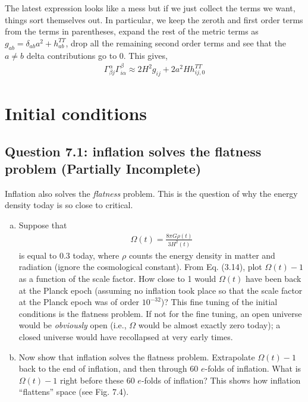 \documentclass[11pt]{article}
\begin{document}
\begin{enumerate}[(a)]
    The latest expression looks like a mess but if we just collect the terms we want, things sort themselves out. In particular, we keep the zeroth and first order terms from the terms in parentheses, expand the rest of the metric terms as $g_{ab} = \delta_{ab}a^2 + h_{ab}^{TT}$, drop all the remaining second order terms and see that the $a \neq b$ delta contributions go to 0. This gives,
    \begin{align*}
        \Gamma^\alpha_{\beta j}\Gamma^\beta_{i\alpha} \approx 2H^2 g_{ij} + 2a^2 H h_{ij,0}^{TT} 
    \end{align*}
\end{enumerate}

\newpage 
\section{Initial conditions}
\subsection{Question 7.1: inflation solves the flatness problem (Partially Incomplete)}
Inflation also solves the \textit{flatness} problem. This is the question of why the energy density today is so close to critical.
\begin{enumerate} [(a)]
    \item Suppose that 
    \begin{align*}
        \Omega(t) = \frac{8\pi G\rho(t)}{3H^2(t)}
    \end{align*}
    is equal to 0.3 today, where $\rho$ counts the energy density in matter and radiation (ignore the cosmological constant). From Eq. (3.14), plot $\Omega(t) -1$ as a function of the scale factor. How close to 1 would $\Omega(t)$ have been back at the Planck epoch (assuming no inflation took place so that the scale factor at the Planck epoch was of order $10^{-32}$)? This fine tuning of the initial conditions is the flatness problem. If not for the fine tuning, an open universe would be \textit{obviously} open (i.e., $\Omega$ would be almost exactly zero today); a closed universe would have recollapsed at very early times. 
    \item Now show that inflation solves the flatness problem. Extrapolate $\Omega(t) - 1$ back to the end of inflation, and then through 60 $e$-folds of inflation. What is $\Omega(t) -1$ right before these 60 $e$-folds of inflation? This shows how inflation ``flattens'' space (see Fig. 7.4). 
\end{enumerate}
\end{document}
